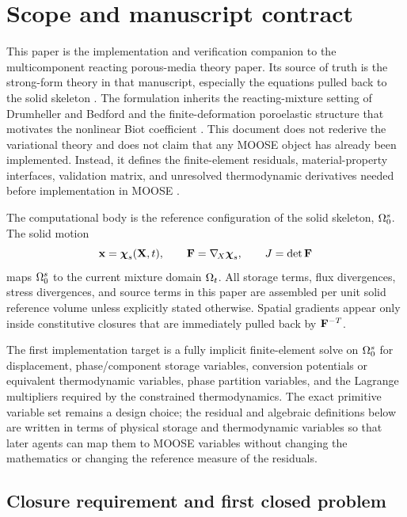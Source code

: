 \section{Scope and manuscript contract}
\label{sec:scope}

This paper is the implementation and verification companion to the
multicomponent reacting porous-media theory paper.  Its source of truth is the
strong-form theory in that manuscript, especially the equations pulled back to
the solid skeleton \cite{foster2026reactingporous}.  The formulation inherits
the reacting-mixture setting of Drumheller and Bedford
\cite{drumheller1980thermomechanical,drumheller2000} and the finite-deformation
poroelastic structure that motivates the nonlinear Biot coefficient
\cite{foster2025}.  This document does not rederive the variational theory and
does not claim that any MOOSE object has already been implemented.  Instead, it
defines the finite-element residuals, material-property interfaces, validation
matrix, and unresolved thermodynamic derivatives needed before implementation in
MOOSE \cite{harbour2025moose}.

The computational body is the reference configuration of the solid skeleton,
\(\Omega_0^s\).  The solid motion
\[
	\mathbf{x} = \boldsymbol{\chi}_s(\mathbf{X},t), \qquad
	\mathbf{F} = \nabla_{\!X} \boldsymbol{\chi}_s, \qquad
	J = \det \mathbf{F}
\]
maps \(\Omega_0^s\) to the current mixture domain \(\Omega_t\).  All storage
terms, flux divergences, stress divergences, and source terms in this paper are
assembled per unit solid reference volume unless explicitly stated otherwise.
Spatial gradients appear only inside constitutive closures that are immediately
pulled back by \(\mathbf{F}^{-T}\).

The first implementation target is a fully implicit finite-element solve on
\(\Omega_0^s\) for displacement, phase/component storage variables, conversion
potentials or equivalent thermodynamic variables, phase partition variables, and
the Lagrange multipliers required by the constrained thermodynamics.  The exact
primitive variable set remains a design choice; the residual and algebraic
definitions below are written in terms of physical storage and thermodynamic
variables so that later agents can map them to MOOSE variables without changing
the mathematics or changing the reference measure of the residuals.

\subsection{Closure requirement and first closed problem}
\label{sec:closure_requirement}

